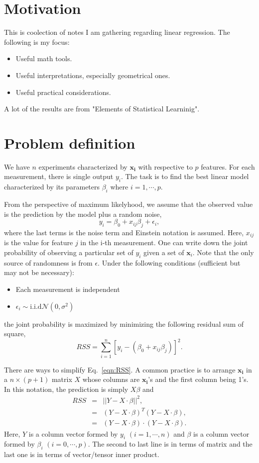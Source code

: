 \section{Motivation}
This is coolection of notes I am gathering regarding linear regression. The following is my focus:
\begin{itemize}
\item Useful math tools.
\item Useful interpretations, especially geometrical ones.
\item Useful practical considerations.
\end{itemize}
A lot of the results are from "Elements of Statistical Learninig".

\section{Problem definition}
We have $n$ experiments characterized by $\mathbf{x_{i}}$ with respective to $p$ features. For each measurement, there is single
output $y_i$. The task is to find the best linear model characterized by its parameters $\beta_i$ where $i=1,\cdots,p$.

From the perspective of maximum likelyhood, we assume that the observed value is the prediction by the model plus a random noise,
\begin{equation}
y_i = \beta_0 + x_{ij}\beta_j + \epsilon_i,
\end{equation} 
where the last terms is the noise term and Einstein notation is assumed. Here, $x_{ij}$ is the value for feature $j$ in the i-th measurement. One can write down
the joint probability of observing a particular set of $y_i$ given a set of $\mathbf{x}_i$. Note that the only source of randomness is from $\epsilon$. Under the 
following conditions (sufficient but may not be necessary):
\begin{itemize}
\item Each measurement is independent
\item $\epsilon_i\sim\mathrm{i.i.d}\mathcal N(0, \sigma^2)$
\end{itemize}
the joint probability is maximized by minimizing the following residual sum of square,
\begin{equation}
RSS = \sum_{i=1}^{n} \left[y_i -( \beta_0 + x_{ij}\beta_j)\right]^2.\label{eqn:RSS}
\end{equation}

There are ways to simplify Eq.~\ref{eqn:RSS}. A common practice is to arrange $\mathbf{x_{i}}$ in a $n\times (p+1)$ matrix $X$ whose columns are $\mathbf{x_i}$'s and
the first column being 1's. In this notation, the prediction is simply $X\beta$ and
\begin{eqnarray}
RSS &=& ||Y-X\cdot\beta||^2,\\
    &=& (Y-X\cdot\beta)^T(Y-X\cdot\beta),\\
    &=& (Y-X\cdot\beta)\cdot(Y-X\cdot\beta).
\end{eqnarray}
Here, $Y$ is a column vector formed by $y_i$ $(i = 1,\cdots,n)$ and $\beta$ is a column vector formed by $\beta_i$ $(i=0, \cdots, p)$. The second to last line is in terms of
matrix and the last one is in terms of vector/tensor inner product.

